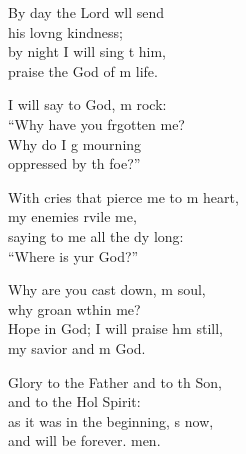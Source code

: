 \begin{psalmverse}
\begin{patverse}
By day the Lord w\pointup{\i}ll send\Med\\
his lov\pointup{\i}ng kindness;\\
by night I will sing t him,\Med\\
praise the God of m life.

I will say to God, m rock:\Med\\
“Why have you frgotten me?\\
Why do I g mourning\Med\\
oppressed by th foe?”

With cries that pierce me to m heart,\Med\\
my enemies rvile me,\\
saying to me all the dy long:\Med\\
“Where is yur God?”

Why are you cast down, m soul,\Med\\
why groan w\pointup{\i}thin me?\\
Hope in God; I will praise h\pointup{\i}m still,\Med\\
my savior and m God.

Glory to the Father and to th Son,\Med\\
and to the Hol Spirit:\\
as it was in the beginning, \pointup{\i}s now,\Med\\
and will be forever. men. 
  \end{patverse}
\end{psalmverse}
